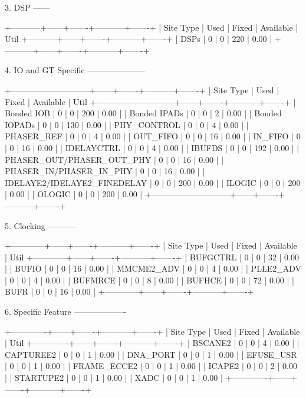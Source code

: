 \documentclass{article}
\begin{document}
3. DSP
------

+-----------+------+-------+-----------+-------+
| Site Type | Used | Fixed | Available | Util%
+-----------+------+-------+-----------+-------+
| DSPs      |    0 |     0 |       220 |  0.00 |
+-----------+------+-------+-----------+-------+


4. IO and GT Specific
---------------------

+-----------------------------+------+-------+-----------+-------+
|          Site Type          | Used | Fixed | Available | Util%
+-----------------------------+------+-------+-----------+-------+
| Bonded IOB                  |    0 |     0 |       200 |  0.00 |
| Bonded IPADs                |    0 |     0 |         2 |  0.00 |
| Bonded IOPADs               |    0 |     0 |       130 |  0.00 |
| PHY_CONTROL                 |    0 |     0 |         4 |  0.00 |
| PHASER_REF                  |    0 |     0 |         4 |  0.00 |
| OUT_FIFO                    |    0 |     0 |        16 |  0.00 |
| IN_FIFO                     |    0 |     0 |        16 |  0.00 |
| IDELAYCTRL                  |    0 |     0 |         4 |  0.00 |
| IBUFDS                      |    0 |     0 |       192 |  0.00 |
| PHASER_OUT/PHASER_OUT_PHY   |    0 |     0 |        16 |  0.00 |
| PHASER_IN/PHASER_IN_PHY     |    0 |     0 |        16 |  0.00 |
| IDELAYE2/IDELAYE2_FINEDELAY |    0 |     0 |       200 |  0.00 |
| ILOGIC                      |    0 |     0 |       200 |  0.00 |
| OLOGIC                      |    0 |     0 |       200 |  0.00 |
+-----------------------------+------+-------+-----------+-------+


5. Clocking
-----------

+------------+------+-------+-----------+-------+
|  Site Type | Used | Fixed | Available | Util%
+------------+------+-------+-----------+-------+
| BUFGCTRL   |    0 |     0 |        32 |  0.00 |
| BUFIO      |    0 |     0 |        16 |  0.00 |
| MMCME2_ADV |    0 |     0 |         4 |  0.00 |
| PLLE2_ADV  |    0 |     0 |         4 |  0.00 |
| BUFMRCE    |    0 |     0 |         8 |  0.00 |
| BUFHCE     |    0 |     0 |        72 |  0.00 |
| BUFR       |    0 |     0 |        16 |  0.00 |
+------------+------+-------+-----------+-------+


6. Specific Feature
-------------------

+-------------+------+-------+-----------+-------+
|  Site Type  | Used | Fixed | Available | Util%
+-------------+------+-------+-----------+-------+
| BSCANE2     |    0 |     0 |         4 |  0.00 |
| CAPTUREE2   |    0 |     0 |         1 |  0.00 |
| DNA_PORT    |    0 |     0 |         1 |  0.00 |
| EFUSE_USR   |    0 |     0 |         1 |  0.00 |
| FRAME_ECCE2 |    0 |     0 |         1 |  0.00 |
| ICAPE2      |    0 |     0 |         2 |  0.00 |
| STARTUPE2   |    0 |     0 |         1 |  0.00 |
| XADC        |    0 |     0 |         1 |  0.00 |
+-------------+------+-------+-----------+-------+
\end{document}
